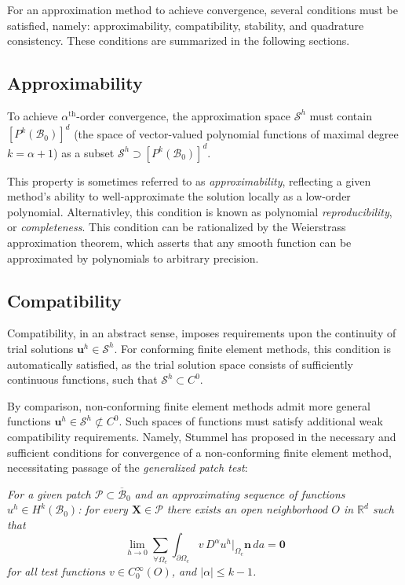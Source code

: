 For an approximation method to achieve convergence, several conditions must be satisfied, namely: approximability, compatibility, stability, and quadrature consistency. These conditions are summarized in the following sections.

	\subsection*{Approximability}
	
	To achieve $\alpha^{\text{th}}$-order convergence, the approximation space $\mathcal{S}^h$ must contain $[ P^{k} (\mathcal{B}_0) ]^d$ (the space of vector-valued polynomial functions of maximal degree $k = \alpha+1$) as a subset $\mathcal{S}^h \supset [ P^{k} (\mathcal{B}_0) ]^d$.
	
	This property is sometimes referred to as \textit{approximability}, reflecting a given method's ability to well-approximate the solution locally as a low-order polynomial. Alternativley, this condition is known as polynomial \textit{reproducibility}, or \textit{completeness}. This condition can be rationalized by the Weierstrass approximation theorem, which asserts that any smooth function can be approximated by polynomials to arbitrary precision.
	
	\subsection*{Compatibility}

	 Compatibility, in an abstract sense, imposes requirements upon the continuity of trial solutions $\mathbf{u}^h \in \mathcal{S}^h$. For conforming finite element methods, this condition is automatically satisfied, as the trial solution space consists of sufficiently continuous functions, such that $\mathcal{S}^h \subset C^0$.

By comparison, non-conforming finite element methods admit more general functions $\mathbf{u}^h \in \mathcal{S}^h \not\subset C^0$. Such spaces of functions must satisfy additional weak compatibility requirements. Namely, Stummel has proposed in \cite{Stummel:79} the necessary and sufficient conditions for convergence of a non-conforming finite element method, necessitating passage of the \textit{generalized patch test}:

\textit{For a given patch $\mathcal{P} \subset \overline{\mathcal{B}}_0$ and an approximating sequence of functions $u^h \in H^k (\mathcal{B}_0)$: for every $\mathbf{X} \in \mathcal{P}$ there exists an open neighborhood $O$ in $\mathbb{R}^d$ such that}
\begin{equation}
  \lim_{h \rightarrow 0} \sum_{\forall \Omega_e} \int_{\partial \Omega_e} v \, D^\alpha u^h|_{\Omega_e} \mathbf{n} \, da = \mathbf{0}
\end{equation}
\textit{for all test functions $v \in C^{\infty}_0 (O)$, and $| \alpha | \leq k-1$.}

